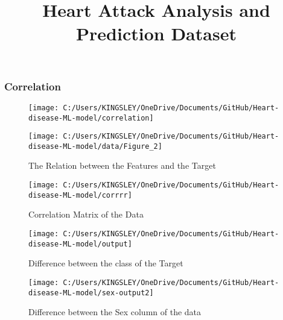 \documentclass[11pt]{beamer}
\begin{document}
	\title{Heart Attack Analysis and Prediction Dataset}
	\begin{frame}[plain]
		\maketitle
	\end{frame}
	
	\begin{frame}
		\frametitle{Correlation}
		\begin{figure}
			\centering
			\texttt{[image: C:/Users/KINGSLEY/OneDrive/Documents/GitHub/Heart-disease-ML-model/correlation]}
			\caption{}
			\label{fig:correlation}
		\end{figure}
		\end{frame}
	\begin{frame}
		\begin{figure}
			\centering
			\texttt{[image: C:/Users/KINGSLEY/OneDrive/Documents/GitHub/Heart-disease-ML-model/data/Figure\_2]}
			\caption{The Relation between the Features and the Target}
			\label{fig:figure2}
		\end{figure}
		
	\end{frame}
		
		\begin{frame}
			\begin{figure}
				\centering
				\texttt{[image: C:/Users/KINGSLEY/OneDrive/Documents/GitHub/Heart-disease-ML-model/corrrr]}
				\caption{Correlation Matrix of the Data}
				\label{fig:corrrr}
			\end{figure}
			
		\end{frame}
\begin{frame}
	\begin{figure}
		\centering
		\texttt{[image: C:/Users/KINGSLEY/OneDrive/Documents/GitHub/Heart-disease-ML-model/output]}
		\caption{ Difference between the class of the Target}
		\label{fig:output}
	\end{figure}
	
\end{frame}

\begin{frame}
	\begin{figure}
		\centering
		\texttt{[image: C:/Users/KINGSLEY/OneDrive/Documents/GitHub/Heart-disease-ML-model/sex-output2]}
		\caption{Difference between the Sex column of the data}
		\label{fig:sex-output2}
	\end{figure}
	
\end{frame}
\end{document}
